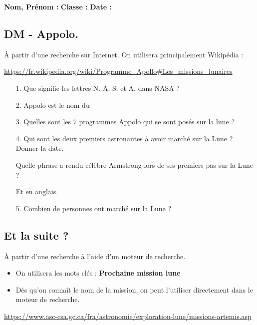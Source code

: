 



\textbf{Nom, Prénom :} \hspace{8cm} \textbf{Classe :} \hspace{3cm} \textbf{Date :}\\

\subsection*{DM - Appolo.}

À partir d'une recherche sur Internet. On utilisera principalement Wikipédia :

\url{https://fr.wikipedia.org/wiki/Programme_Apollo#Les_missions_lunaires}


\begin{enumerate}
  \item[1.]Que signifie les lettres N. A. S. et A. dans NASA ? \\
  \Pointilles[2]

  \item[2.]Appolo est le nom du \dotfill
  
  \item[3.]Quelles sont les 7 programmes Appolo qui se sont posés sur la lune ? \\
  \Pointilles[4]

  \item[4.]Qui sont les deux premiers astronautes à avoir marché sur la Lune ? Donner la date.\\
  \Pointilles[1]

  Quelle phrase a rendu célèbre Armstrong lors de ses premiers pas sur la Lune ? \\
  \Pointilles[2]

  Et en anglais. \\
  \Pointilles[2]

  \item[5.]Combien de personnes ont marché sur la Lune ? \\
  \Pointilles[3]
\end{enumerate}

\subsection*{Et la suite ?}

À partir d'une recherche à l'aide d'un moteur de recherche. 

\begin{itemize}
  \item On utilisera les mots clés : \textbf{Prochaine mission lune}
  \item Dès qu'on connaît le nom de la mission, on peut l'utiliser directement dans le moteur de recherche.
\end{itemize}
\url{https://www.asc-csa.gc.ca/fra/astronomie/exploration-lune/missions-artemis.asp}

